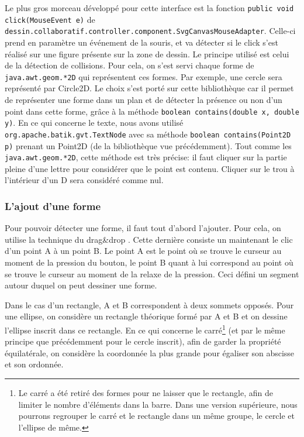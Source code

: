 \documentclass[a4paper,11pt]{article}
\begin{document}
Le plus gros morceau d\'evelopp\'e pour cette interface est la fonction  \texttt{public void click(MouseEvent e)} de \texttt{dessin.collaboratif.controller.component.SvgCanvasMouseAdapter}. Celle-ci prend en paramètre un \'ev\'enement de la souris, et va d\'etecter si le click s'est r\'ealis\'e sur une figure pr\'esente sur la zone de dessin. Le principe utilis\'e est celui de la d\'etection de collisions. Pour cela, on s'est servi chaque forme de \texttt{java.awt.geom.*2D} qui repr\'esentent ces formes. Par exemple, une cercle sera repr\'esent\'e par Circle2D. Le choix s'est port\'e sur cette bibliothèque car il permet de repr\'esenter une forme dans un plan et de d\'etecter la pr\'esence ou non d'un point dans cette forme, gr\^ace \`a la m\'ethode \texttt{boolean contains(double x, double y)}. En ce qui concerne le texte, nous avons utilis\'e \texttt{org.apache.batik.gvt.TextNode} avec sa m\'ethode \texttt{boolean contains(Point2D p)} prenant un Point2D (de la bibliothèque vue pr\'ec\'edemment). Tout comme les \texttt{java.awt.geom.*2D}, cette m\'ethode est tr\`es pr\'ecise: il faut cliquer sur la partie pleine d'une lettre pour consid\'erer que le point est contenu. Cliquer sur le \og trou \fg \`a l'int\'erieur d'un D sera consid\'er\'e comme nul.

\subsubsection{L'ajout d'une forme}

Pour pouvoir d\'etecter une forme, il faut tout d'abord l'ajouter. Pour cela, on utilise la technique du \og drag\&drop \fg. Cette derni\`ere consiste un maintenant le clic d'un point A \`a un point B. Le point A est le point o\`u se trouve le curseur au moment de la pression du bouton, le point B quant \`a lui correspond au point o\`u se trouve le curseur au moment de la relaxe de la pression. Ceci d\'efini un segment autour duquel on peut dessiner une forme. 

Dans le cas d'un rectangle, A et B correspondent \`a deux sommets oppos\'es. Pour une ellipse, on consid\`ere un rectangle th\'eorique form\'e par A et B et on dessine l'ellipse inscrit dans ce rectangle. En ce qui concerne le carr\'e\footnote{Le carr\'e a \'et\'e retir\'e des formes pour ne laisser que le rectangle, afin de limiter le nombre d'\'el\'ements dans la barre. Dans une version sup\'erieure, nous pourrons regrouper le carr\'e et le rectangle dans un m\^eme groupe, le cercle et l'ellipse de m\^eme.} (et par le m\^eme principe que pr\'ec\'edemment pour le cercle inscrit), afin de garder la propri\'et\'e \'equilat\'erale, on consid\`ere la coordonn\'ee la plus grande pour \'egaliser son abscisse et son ordonn\'ee. 
\end{document}
